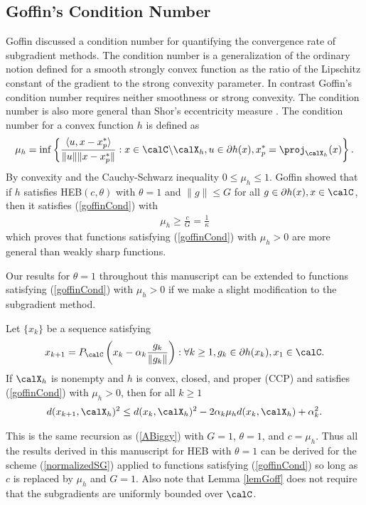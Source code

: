  \subsection{Goffin's Condition Number}\label{goff_cond}  
  Goffin \cite{goffin1977convergence} discussed a condition number for quantifying the convergence rate of subgradient methods. The condition number is a generalization of the ordinary notion defined for a smooth strongly convex function as the ratio of the Lipschitz constant of the gradient to the strong convexity parameter. In contrast Goffin's condition number requires neither smoothness or strong convexity. The condition number is also more general than Shor's eccentricity measure \cite{shor2012minimization}. The condition number for a convex function $h$ is defined as
  \begin{eqnarray}\label{goffinCond}
  \mu_{h}=\inf\left\{\frac{\langle u ,x-x^*_p\rangle}{\|u\|\|x-x_p^*\|}: x\in\calC\backslash \calX_h,u\in\partial h(x),x_p^*=\proj_{\calX_h}(x)\right\}.
  \end{eqnarray}
 By convexity and the Cauchy-Schwarz inequality $0\leq\mu_h\leq 1$. Goffin showed that if $h$ satisfies HEB$(c,\theta)$ with $\theta=1$ and $\|g\|\leq G$ for all $g\in\partial h(x),x\in\calC$, then it satisfies (\ref{goffinCond}) with
  \begin{eqnarray*}
  \mu_h\geq\frac{c}{G}=\frac{1}{\kappa}
  \end{eqnarray*}
  which proves that functions satisfying (\ref{goffinCond}) with $\mu_h>0$ are more general than weakly sharp functions. 
  
  Our results for $\theta=1$ throughout this manuscript can be extended to functions satisfying (\ref{goffinCond}) with $\mu_h>0$ if we make a slight modification to the subgradient method.
  \begin{lemma}
  Let $\{x_k\}$ be a sequence satisfying
  \begin{eqnarray}\label{normalizedSG}
  x_{k+1}=P_\calC\left(x_k-\alpha_k\frac{g_k}{\|g_k\|}\right):\forall k\geq 1,g_k\in\partial h(x_k),x_1\in\calC.
  \end{eqnarray}
  If $\calX_h$ is nonempty and $h$ is convex, closed, and proper (CCP) and satisfies (\ref{goffinCond}) with $\mu_h>0$, then for all $k\geq 1$
  \begin{eqnarray*}
  d(x_{k+1},\calX_h)^2\leq d(x_k,\calX_h)^2-2\alpha_k\mu_h d(x_k,\calX_h)+\alpha_k^2.
  \end{eqnarray*}\label{lemGoff}
  \end{lemma}  
  This is the same recursion as (\ref{ABiggy}) with $G=1$, $\theta=1$,  and $c=\mu_h$. Thus all the results derived in this manuscript for HEB with $\theta=1$ can be derived for the scheme (\ref{normalizedSG}) applied to functions satisfying (\ref{goffinCond}) so long as $c$ is replaced by $\mu_h$ and $G=1$. Also note that Lemma \ref{lemGoff} does not require that the subgradients are uniformly bounded over $\calC$. 
 


